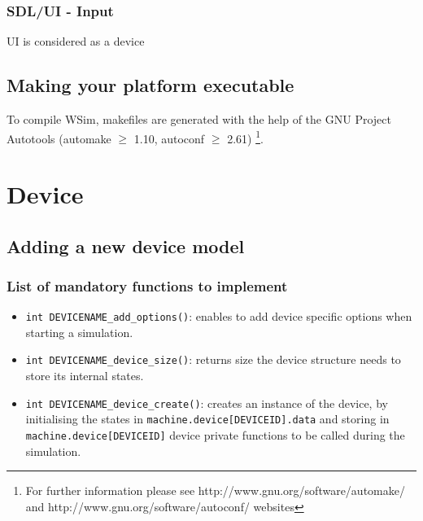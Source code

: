 \documentclass[a4paper,10pt]{report}
\begin{document}
\subsubsection{SDL/UI - Input}
UI is considered as a device


\subsection{Making your platform executable}
To compile WSim, makefiles are generated with the help of the GNU Project Autotools (automake $\ge$ 1.10, autoconf $\ge$ 2.61) \footnote{For further information please see http://www.gnu.org/software/automake/ and 
http://www.gnu.org/software/autoconf/ websites}.


\section{Device}
\subsection{Adding a new device model}
\subsubsection{List of mandatory functions to implement}
\begin{itemize}
  \item \verb$int DEVICENAME_add_options()$: enables to add device specific options when starting a simulation.
  \item \verb$int DEVICENAME_device_size()$: returns size the device structure needs to store its internal states.
  \item \verb$int DEVICENAME_device_create()$: creates an instance of the device, by initialising the states in \verb$machine.device[DEVICEID].data$ and storing in \verb$machine.device[DEVICEID]$ device private functions to be called during the simulation.
\end{itemize}
\end{document}
